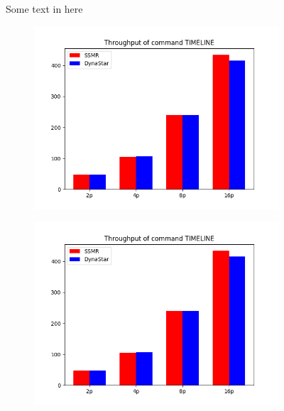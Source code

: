 \begin{figure}[h!]
\begin{subfigure}{.47\textwidth}
    \caption{}
  \end{subfigure}
  \caption{Some text in here}%
  \label{fig:socialcelebrity}
\end{figure}

\begin{figure}[h!]
  \centering
  \begin{subfigure}{.4\textwidth}
    \centering
    \includegraphics[width=\textwidth]{./figures/eurosys/timeline.png}
  \end{subfigure}
  \begin{subfigure}{.4\textwidth}
    \centering
    \includegraphics[width=\textwidth]{./figures/eurosys/timeline.png}
  \end{subfigure}

\end{figure}
